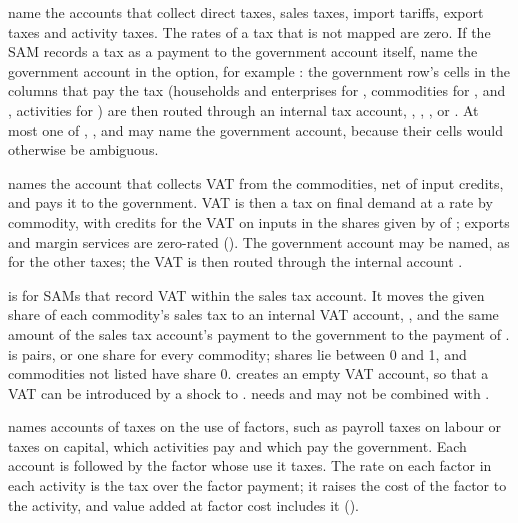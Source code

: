 \begin{optdesc}
\item[\optarg{}{dirtax}{name}, \optarg{}{saltax}{name},
\optarg{}{imptax}{name}, \optarg{}{exptax}{name} and \optarg{}{acttax}{name}]
name the accounts that collect direct taxes, sales taxes, import tariffs,
export taxes and activity taxes. The rates of a tax that is not mapped are
zero. If the SAM records a tax as a payment to the government account itself,
name the government account in the option, for example : the
government row's cells in the columns that pay the tax (households and
enterprises for , commodities for ,
 and , activities for ) are then
routed through an internal tax account, , ,
,  or . At most one of ,
,  and  may name the government
account, because their cells would otherwise be ambiguous.

\item[\optarg{}{vattax}{name}] names the account that collects VAT from the
commodities, net of input credits, and pays it to the government. VAT is then
a tax on final demand at a rate by commodity, with credits for the VAT on
inputs in the shares given by  of ;
exports and margin services are zero-rated (). The government
account may be named, as for the other taxes; the VAT is then routed through
the internal account .

\item[\optarg{vats}{hare}{spec}] is for SAMs that record VAT within the sales
tax account. It moves the given share of each commodity's sales tax to an
internal VAT account, , and the same amount of the sales tax
account's payment to the government to the payment of .
 is \cmd{:} pairs, or one share for
every commodity; shares lie between 0 and 1, and commodities not listed have
share 0.  creates an empty VAT account, so that a VAT can be
introduced by a shock to .  needs  and
may not be combined with .

\item[\optarg{factort}{ax}{account\texttt{:}factor \ldots}] names accounts of
taxes on the use of factors, such as payroll taxes on labour or taxes on
capital, which activities pay and which pay the government. Each account is
followed by the factor whose use it taxes. The rate on each factor in each
activity is the tax over the factor payment; it raises the cost of the factor
to the activity, and value added at factor cost includes it
().


\end{optdesc}

